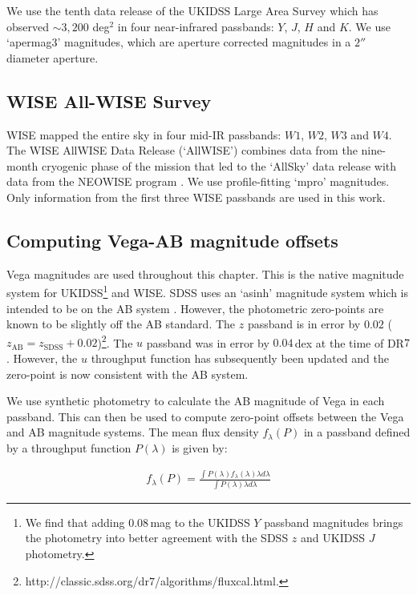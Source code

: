 We use the tenth data release of the UKIDSS Large Area Survey which has observed $\sim 3,200$ deg$^2$ in four near-infrared passbands: $Y$, $J$, $H$ and $K$. 
We use `apermag$3$' magnitudes, which are aperture corrected magnitudes in a $2''$ diameter aperture.

\subsection{WISE All-WISE Survey}

WISE mapped the entire sky in four mid-IR passbands: $W1$, $W2$, $W3$ and $W4$. 
The WISE AllWISE Data Release (`AllWISE') combines data from the nine-month cryogenic phase of the mission that led to the `AllSky' data release with data from the NEOWISE program \citep{mainzer11}. 
We use profile-fitting `mpro' magnitudes.   
Only information from the first three WISE passbands are used in this work.

\subsection{Computing Vega-AB magnitude offsets}

Vega magnitudes are used throughout this chapter. 
This is the native magnitude system for UKIDSS\footnote{We find that adding $0.08$\,mag to the UKIDSS $Y$ passband magnitudes brings the photometry into better agreement with the SDSS $z$ and UKIDSS $J$ photometry.} and WISE.
SDSS uses an `asinh' magnitude system \citep{lupton99} which is intended to be on the AB system \citep{oke83}.
However, the photometric zero-points are known to be slightly off the AB standard. 
The $z$ passband is in error by $0.02$ ($z_{\text{AB}} = z_{\text{SDSS}} + 0.02$)\footnote{http://classic.sdss.org/dr$7$/algorithms/fluxcal.html.}.
The $u$ passband was in error by $0.04$\,dex at the time of DR$7$. 
However, the $u$ throughput function has subsequently been updated \citep{doi10} and the zero-point is now consistent with the AB system.  

We use synthetic photometry to calculate the AB magnitude of Vega in each passband. 
This can then be used to compute zero-point offsets between the Vega and AB magnitude systems. 
The mean flux density $f_\lambda(P)$ in a passband defined by a throughput function $P(\lambda)$ is given by: 

\begingroup\makeatletter{}\check@mathfonts
\begin{eqnarray}
\label{eq:flux}
  f_\lambda(P) = \frac {\int P(\lambda)f_\lambda(\lambda)\lambda d\lambda} {\int P(\lambda)\lambda d\lambda} 
\end{eqnarray}
\endgroup

